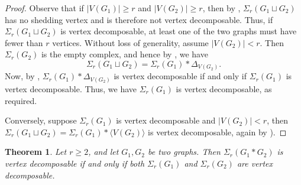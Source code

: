 \documentclass[12pt,reqno]{amsart}
\newtheorem{theorem}[proposition]{Theorem}
\theoremstyle{definition}
\begin{document}
	\begin{proof}
		Observe that if $|V(G_1)| \geq r$ and $|V(G_2)| \geq r$, then by ,  
		$\Sigma_r(G_1 \sqcup G_2)$ has no shedding vertex and is therefore not vertex decomposable.  
		Thus, if $\Sigma_r(G_1 \sqcup G_2)$ is vertex decomposable, at least one of the two graphs must have fewer than $r$ vertices.  
		Without loss of generality, assume $|V(G_2)| < r$. Then $\Sigma_r(G_2)$ is the empty complex, and hence by , we have
		\[
		\Sigma_r(G_1 \sqcup G_2) 
		= \Sigma_r(G_1) * \Delta_{V(G_2)}.
		\]
		Now, by \cite[Proposition 2.4]{ProBill1980}, $\Sigma_r(G_1) * \Delta_{V(G_2)}$ is vertex decomposable if and only if $\Sigma_r(G_1)$ is vertex decomposable. Thus, we have $\Sigma_r(G_1)$ is vertex decomposable, as required.
		
		Conversely, suppose $\Sigma_r(G_1)$ is vertex decomposable and $|V(G_2)| < r$, then  
		$\Sigma_r(G_1 \sqcup G_2) = \Sigma_r(G_1) * \langle V(G_2) \rangle$ is vertex decomposable, again by \cite[Proposition 2.4]{ProBill1980}).
	\end{proof}

	\begin{theorem}\label{V.D. of the join of graphs}
		Let $r\ge 2$, and let $G_1,G_2$ be two graphs. Then $\Sigma_r(G_1 * G_2)$ is vertex decomposable if and only if both $\Sigma_r(G_1)$ and $\Sigma_r(G_2)$ are vertex decomposable.
	\end{theorem}
	
\end{document}
